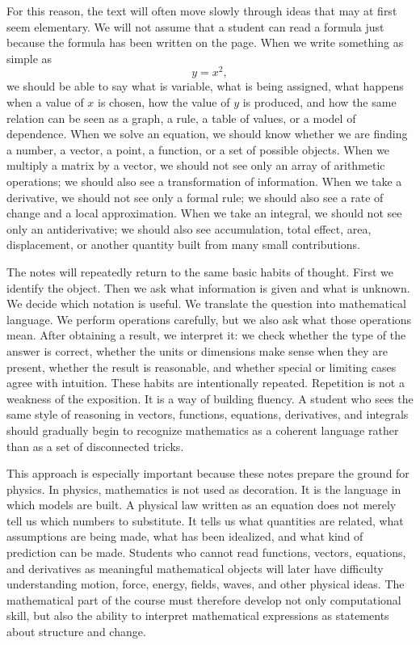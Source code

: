 For this reason, the text will often move slowly through ideas that may at first seem elementary. We will not assume that a student can read a formula just because the formula has been written on the page. When we write something as simple as
\[
y = x^2,
\]
we should be able to say what is variable, what is being assigned, what happens when a value of \(x\) is chosen, how the value of \(y\) is produced, and how the same relation can be seen as a graph, a rule, a table of values, or a model of dependence. When we solve an equation, we should know whether we are finding a number, a vector, a point, a function, or a set of possible objects. When we multiply a matrix by a vector, we should not see only an array of arithmetic operations; we should also see a transformation of information. When we take a derivative, we should not see only a formal rule; we should also see a rate of change and a local approximation. When we take an integral, we should not see only an antiderivative; we should also see accumulation, total effect, area, displacement, or another quantity built from many small contributions.

The notes will repeatedly return to the same basic habits of thought. First we identify the object. Then we ask what information is given and what is unknown. We decide which notation is useful. We translate the question into mathematical language. We perform operations carefully, but we also ask what those operations mean. After obtaining a result, we interpret it: we check whether the type of the answer is correct, whether the units or dimensions make sense when they are present, whether the result is reasonable, and whether special or limiting cases agree with intuition. These habits are intentionally repeated. Repetition is not a weakness of the exposition. It is a way of building fluency. A student who sees the same style of reasoning in vectors, functions, equations, derivatives, and integrals should gradually begin to recognize mathematics as a coherent language rather than as a set of disconnected tricks.

This approach is especially important because these notes prepare the ground for physics. In physics, mathematics is not used as decoration. It is the language in which models are built. A physical law written as an equation does not merely tell us which numbers to substitute. It tells us what quantities are related, what assumptions are being made, what has been idealized, and what kind of prediction can be made. Students who cannot read functions, vectors, equations, and derivatives as meaningful mathematical objects will later have difficulty understanding motion, force, energy, fields, waves, and other physical ideas. The mathematical part of the course must therefore develop not only computational skill, but also the ability to interpret mathematical expressions as statements about structure and change.

